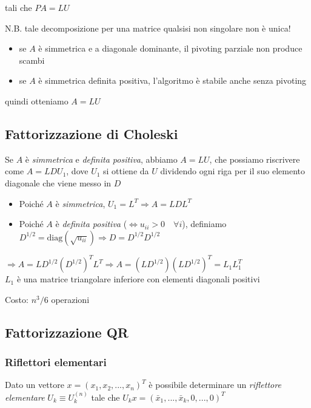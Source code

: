 \documentclass[openany]{book}
\begin{document}
tali che $PA=LU $

N.B. tale decomposizione per una matrice qualsisi non singolare non è unica!

\begin{itemize}
	\item se $A$ è simmetrica e a diagonale dominante, il pivoting parziale non produce scambi
	\item se $ A$ è simmetrica definita positiva, l'algoritmo è stabile anche senza pivoting
\end{itemize}

quindi otteniamo $A=LU$

\subsection {Fattorizzazione di Choleski}

Se $A$ è \textit{simmetrica} e \textit{definita positiva}, abbiamo $A=LU$, che possiamo riscrivere come $A=LDU_1$, dove $U_1$ si ottiene da $U$ dividendo ogni riga per il suo elemento diagonale che viene messo in $D$

\begin{itemize}
	\item Poiché $A$ è \textit{simmetrica}, $U_1 = L^T \Rightarrow A=LDL^T$ 
	\item Poiché $A$ è \textit{definita positiva} ($\Leftrightarrow u_{ii}>0 \quad \forall i$), definiamo $D^{1/2}=\text {diag}(\sqrt {u_{ii}})\Rightarrow D=D^{1/2}D^{1/2}$

\end{itemize}

$\Rightarrow A=LD^{1/2}(D^{1/2})^T L^T\Rightarrow A=(LD^{1/2})(LD^{1/2})^T=L_1L_1^T$
\\

$L_1$ è una matrice triangolare inferiore con elementi diagonali positivi

Costo: $n^3/6$ operazioni

\subsection {Fattorizzazione QR}

\subsubsection {Riflettori elementari}

Dato un vettore $x=(x_1,x_2,...,x_n)^T$ è possibile determinare un \textit{riflettore elementare} $U_k \equiv U_k^{(n)}$ tale che $U_kx=(\bar{x}_1,...,\bar{x}_k,0,...,0)^T$
\end{document}
